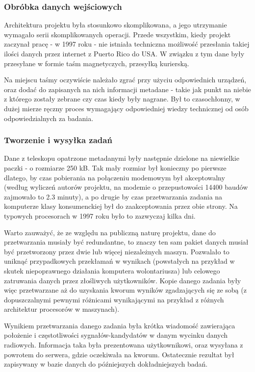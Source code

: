 \documentclass[12pt,a4paper,twoside]{article}
\begin{document}
\subsubsection{Obróbka danych wejściowych}

Architektura projektu była stosunkowo skomplikowana, a jego utrzymanie wymagało serii skomplikowanych operacji. Przede wszystkim, kiedy projekt zaczynał pracę - w 1997 roku - nie istniała techniczna możliwość przesłania takiej ilości danych przez internet z Puerto Rico do USA. W związku z tym dane były przesyłane w formie taśm magnetyczych, przesyłką kurierską. 

Na miejscu taśmy oczywiście należało zgrać przy użyciu odpowiednich urządzeń, oraz dodać do zapisanych na nich informacji metadane - takie jak punkt na niebie z którego zostały zebrane czy czas kiedy były nagrane. Był to czasochłonny, w dużej mierze ręczny proces wymagający odpowiedniej wiedzy technicznej od osób odpowiedzialnych za badania.

\subsubsection{Tworzenie i wysyłka zadań}

Dane z teleskopu opatrzone metadanymi były następnie dzielone na niewielkie paczki - o rozmiarze 250 kB. Tak mały rozmiar był konieczny po pierwsze dlatego, by czas pobierania na połączeniu modemowym był akceptowalny (według wyliczeń autorów projektu, na modemie o przepustowości 14400 baudów zajmowało to 2.3 minuty), a po drugie by czas przetwarzania zadania na komputerze klasy konsumenckiej był do zaakceptowania przez obie strony. Na typowych procesorach w 1997 roku było to zazwyczaj kilka dni. 

Warto zauważyć, że ze względu na publiczną naturę projektu, dane do przetwarzania musiały być redundantne, to znaczy ten sam pakiet danych musiał być przetworzony przez dwie lub więcej niezależnych maszyn. Pozwalało to uniknąć przypadkowych przekłamań w wynikach (powstałych na przykład w skutek niepoprawnego działania komputera wolontariusza) lub celowego zatruwania danych przez złośliwych użytkowników. Kopie danego zadania były więc przetwarzane aż do uzyskania kworum wyników zgadzających się ze sobą (z dopuszczalnymi pewnymi różnicami wynikającymi na przykład z różnych architektur procesorów w maszynach). 

Wynikiem przetwarzania danego zadania była krótka wiadomość zawierająca położenie i częstotliwości sygnałów-kandydatów w danym wycinku danych radiowych. Informacja taka była prezentowana użytkownikowi, oraz wysyłana z powrotem do serwera, gdzie oczekiwała na kworum. Ostatecznie rezultat był zapisywany w bazie danych do późniejszych dokładniejszych badań.
\end{document}
